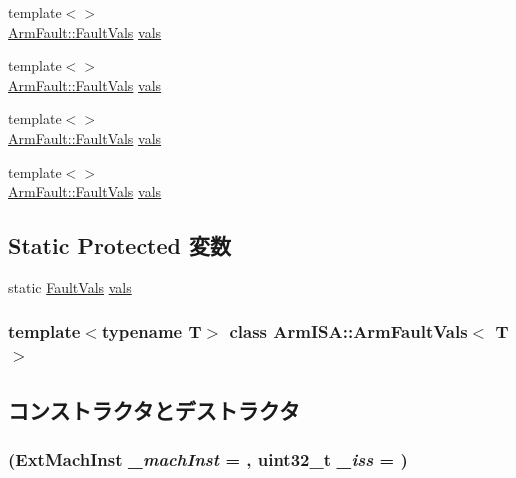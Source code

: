 \begin{DoxyCompactItemize}
\item 
{\footnotesize template$<$$>$ }\\\hyperlink{structArmISA_1_1ArmFault_1_1FaultVals}{ArmFault::FaultVals} \hyperlink{classArmISA_1_1ArmFaultVals_a7b40df863f325ba499b5fa5a34ad8f9d}{vals}
\item 
{\footnotesize template$<$$>$ }\\\hyperlink{structArmISA_1_1ArmFault_1_1FaultVals}{ArmFault::FaultVals} \hyperlink{classArmISA_1_1ArmFaultVals_a7b40df863f325ba499b5fa5a34ad8f9d}{vals}
\item 
{\footnotesize template$<$$>$ }\\\hyperlink{structArmISA_1_1ArmFault_1_1FaultVals}{ArmFault::FaultVals} \hyperlink{classArmISA_1_1ArmFaultVals_a7b40df863f325ba499b5fa5a34ad8f9d}{vals}
\item 
{\footnotesize template$<$$>$ }\\\hyperlink{structArmISA_1_1ArmFault_1_1FaultVals}{ArmFault::FaultVals} \hyperlink{classArmISA_1_1ArmFaultVals_a7b40df863f325ba499b5fa5a34ad8f9d}{vals}
\end{DoxyCompactItemize}
\subsection*{Static Protected 変数}
\begin{DoxyCompactItemize}
\item 
static \hyperlink{structArmISA_1_1ArmFault_1_1FaultVals}{FaultVals} \hyperlink{classArmISA_1_1ArmFaultVals_a8b3c2006cfd550d551232a82b397bbca}{vals}
\end{DoxyCompactItemize}
\subsubsection*{template$<$typename T$>$ class ArmISA::ArmFaultVals$<$ T $>$}



\subsection{コンストラクタとデストラクタ}
\hypertarget{classArmISA_1_1ArmFaultVals_a76dcdcf4411aec99e3180cf1dda1e388}{
\subsubsection[{ArmFaultVals}]{ (ExtMachInst {\em \_\-machInst} = {}, \/  {\bf uint32\_\-t} {\em \_\-iss} = {})}}
\label{classArmISA_1_1ArmFaultVals_a76dcdcf4411aec99e3180cf1dda1e388}


